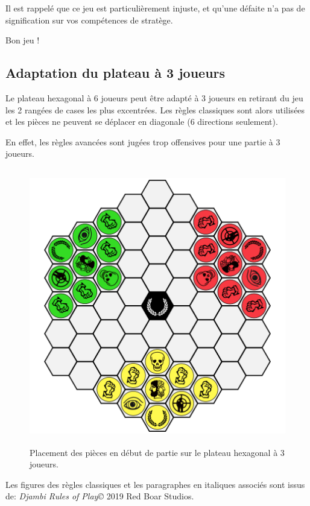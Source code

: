 \documentclass{article}
\begin{document}
\vspace{10pt} %

Il est rappelé que ce jeu est particulièrement injuste, et qu'une défaite n'a pas de signification sur vos compétences de stratège.
\vspace{10pt} %

Bon jeu !

\newpage

\subsection{Adaptation du plateau à 3 joueurs}

Le plateau hexagonal à 6 joueurs peut être adapté à 3 joueurs en retirant du jeu les 2 rangées de cases les plus excentrées.
Les règles classiques sont alors utilisées et les pièces ne peuvent se déplacer en diagonale (6 directions seulement).

En effet, les règles avancées sont jugées trop offensives pour une partie à 3 joueurs.

\vspace{15pt} %


\begin{figure}[ht]
\centering
\includegraphics[width=4.75972in,height=4.76111in]{media/dja_3_tablier.png}
\caption{Placement des pièces en début de partie sur le plateau hexagonal à 3 joueurs.}
\end{figure}

\vspace{25pt} %

Les figures des règles classiques et les paragraphes en italiques associés sont issus de: \textit{Djambi Rules of Play©} 2019 Red Boar Studios.
\end{document}

